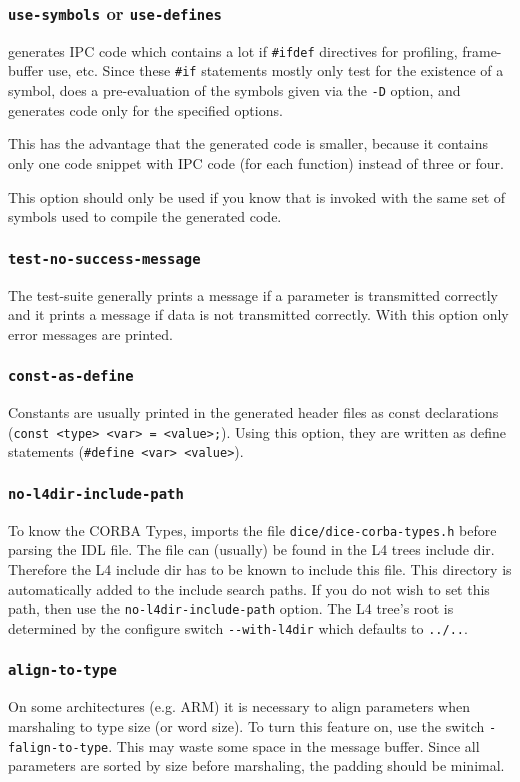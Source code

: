 \subsubsection{{\tt use-symbols} or {\tt use-defines}}
\dice{} generates IPC code which contains a lot if \verb|#ifdef|
directives for profiling, frame-buffer use, etc. Since these \verb|#if|
statements mostly only test for the existence of a symbol, \dice{}
does a pre-evaluation of the symbols given via the {\tt -D} option,
and generates code only for the specified options.

This has the advantage that the generated code is smaller, because it
contains only one code snippet with IPC code (for each function) instead
of three or four.

This option should only be used if you know that \dice{} is invoked with
the same set of symbols used to compile the generated code.

\subsubsection{{\tt test-no-success-message}}
The test-suite generally prints a message if a parameter is transmitted 
correctly and it prints a message if data is not transmitted correctly.
With this option only error messages are printed.

\subsubsection{\tt const-as-define}
Constants are usually printed in the generated header files as const
declarations (\verb|const <type> <var> = <value>;|). Using this option,
they are written as define statements (\verb|#define <var> <value>|).

\subsubsection{\tt no-l4dir-include-path}
To know the CORBA Types, \dice{} imports the file \verb|dice/dice-corba-types.h|
before parsing the IDL file. The file can (usually) be found in
the L4 trees include dir. Therefore the L4 include dir has to be
known to include this file. This directory is automatically added to
the include search paths. If you do not wish to set this path, then
use the {\tt no-l4dir-include-path} option. The L4 tree's root is
determined by the configure switch \verb|--with-l4dir| which defaults
to \verb|../..|.

\subsubsection{\tt align-to-type}
On some architectures (e.g. ARM) it is necessary to align parameters 
when marshaling to type size (or word size). To turn this feature on,
use the switch \verb|-falign-to-type|. This may waste some space in the
message buffer. Since all parameters are sorted by size before marshaling,
the padding should be minimal.

